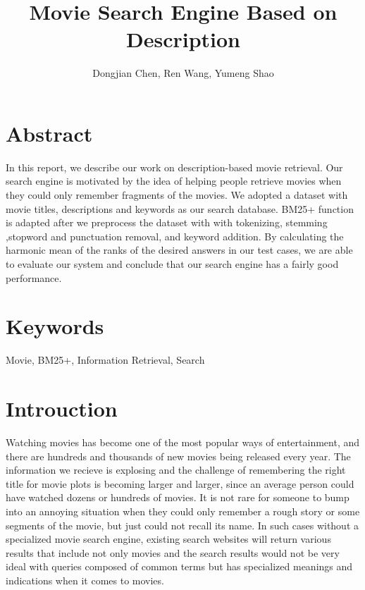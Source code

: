 \documentclass[letterpaper,10pt]{article}
\title{Movie Search Engine Based on Description}
\author{Dongjian Chen, Ren Wang, Yumeng Shao}
\begin{document}
\maketitle



\begin{multicols}{2}
    \section*{Abstract}
    In this report, we describe our work on description-based movie retrieval. Our search engine is motivated by the idea of helping people retrieve movies when they could only remember fragments of the movies. We adopted a dataset with movie titles, descriptions and keywords as our search database. BM25+ function is adapted after we preprocess the dataset with with tokenizing, stemming ,stopword and punctuation removal, and keyword addition. By calculating the harmonic mean of the ranks of the desired answers in our test cases, we are able to evaluate our system and conclude that our search engine has a fairly good performance.

    \section*{Keywords}

    Movie, BM25+, Information Retrieval, Search

    \vfill\null
    \columnbreak


    \section{Introuction}

    Watching movies has become one of the most popular ways of entertainment, and there are hundreds and thousands of new movies being released every year. The information we recieve is explosing and the challenge of remembering the right title for movie plots is becoming larger and larger, since an average person could have watched dozens or hundreds of movies. It is not rare for someone to bump into an annoying situation when they could only remember a rough story or some segments of the movie, but just could not recall its name. In such cases without a specialized movie search engine, existing search websites will return various results that include not only movies and the search results would not be very ideal with queries composed of common terms but has specialized meanings and indications when it comes to movies.


\end{multicols}
\end{document}
